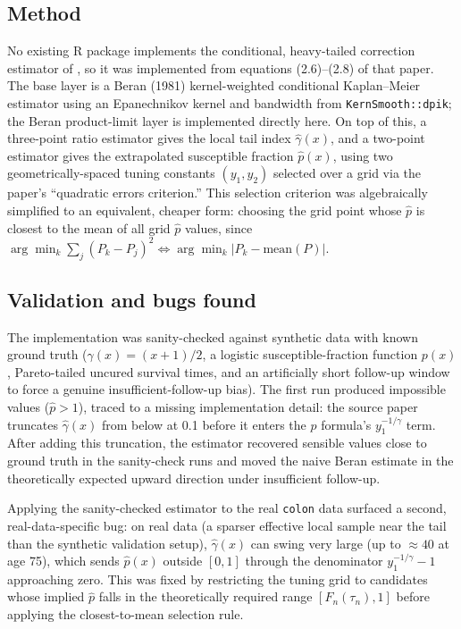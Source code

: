 \documentclass[11pt]{article}
\begin{document}
\subsection{Method}

No existing R package implements the conditional, heavy-tailed correction
estimator of \citet{ebvk2023}, so it was implemented from equations (2.6)--(2.8) of
that paper. The base layer is a Beran (1981) kernel-weighted conditional
Kaplan--Meier estimator using an Epanechnikov kernel and bandwidth from
\texttt{KernSmooth::dpik}; the Beran product-limit layer is implemented directly here. On top of this, a three-point ratio
estimator gives the local tail index $\hat\gamma(x)$, and a two-point estimator
gives the extrapolated susceptible fraction $\hat p(x)$, using two geometrically-spaced
tuning constants $(y_1, y_2)$ selected over a grid via the paper's ``quadratic
errors criterion.'' This selection criterion was algebraically simplified to an
equivalent, cheaper form: choosing the grid point whose $\hat p$ is closest to the
mean of all grid $\hat p$ values, since
$\arg\min_k \sum_j (P_k - P_j)^2 \Leftrightarrow \arg\min_k |P_k - \text{mean}(P)|$.

\subsection{Validation and bugs found}

The implementation was sanity-checked against synthetic data with known ground truth
($\gamma(x)=(x{+}1)/2$, a logistic susceptible-fraction function $p(x)$, Pareto-tailed
uncured survival times, and an artificially short follow-up window to force a
genuine insufficient-follow-up bias). The first run produced impossible values
($\hat p > 1$), traced to a missing implementation detail: the source paper
truncates $\hat\gamma(x)$ from below at 0.1 before it enters the $\hat p$ formula's
$y_1^{-1/\gamma}$ term. After adding this truncation, the estimator recovered sensible values close to
ground truth in the sanity-check runs and moved the naive Beran estimate in the
theoretically expected upward direction under insufficient follow-up.

Applying the sanity-checked estimator to the real \texttt{colon} data surfaced a second,
real-data-specific bug: on real data (a sparser effective local sample near the
tail than the synthetic validation setup), $\hat\gamma(x)$ can swing very large
(up to $\approx 40$ at age 75), which sends $\hat p(x)$ outside $[0,1]$ through the
denominator $y_1^{-1/\gamma}-1$ approaching zero. This was fixed by restricting the
tuning grid to candidates whose implied $\hat p$ falls in the theoretically required
range $[F_n(\tau_n), 1]$ before applying the closest-to-mean selection rule.
\end{document}
